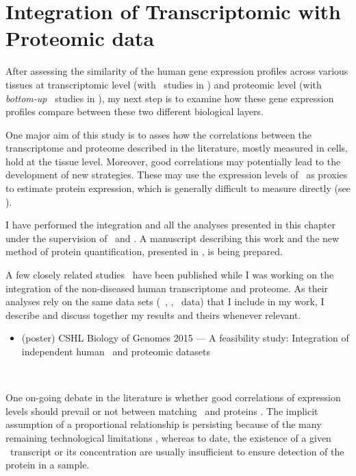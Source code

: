 \chapter{Integration of Transcriptomic with Proteomic data}\label{ch:Integration}
After assessing the similarity of the human gene expression profiles
across various tissues
at transcriptomic level (with \Rnaseq\ studies in )
and proteomic level (with \emph{bottom-up} \ms\ studies in ),
my next step is to examine how these gene expression profiles
compare between these two different biological layers.

One major aim of this study is to asses
how the correlations between the transcriptome and proteome
described in the literature, mostly measured in cells,
hold at the tissue level.
Moreover, good correlations may potentially lead to
the development of new strategies.
These may use the expression levels of \mRNA\ as proxies
to estimate protein expression,
which is generally difficult to measure directly (see ).

I have performed the integration and all the analyses presented in this chapter
under the supervision of \alvis\ and \jyoti.
A manuscript describing this work
and the new method of protein quantification, presented in ,
is being prepared.

A few closely related studies~ have
been published while I was working on
the integration of the non-diseased human transcriptome and proteome.
As their analyses rely on the same data sets (\ie\ \uhlen, \gtex, \pandey\ data)
that I include in my work,
I describe and discuss together my results and theirs
whenever relevant.

\derivativeWork{}
\begin{itemize}[topsep=0pt,nosep]
    \item (poster) CSHL  Biology of Genomes 2015 --- A feasibility study:
        Integration of independent human \Rnaseq\ and proteomic datasets
\end{itemize}

\clearpage\

\vspace{-1cm}

One on-going debate in the literature is
whether good correlations of expression levels should prevail or not
between matching \mRNAs\ and proteins .
The implicit assumption of a proportional relationship is persisting
because of the many remaining technological limitations ,
whereas to date, the existence of a given \mRNA\ transcript or its concentration
are usually insufficient to ensure detection of the protein in a sample.

